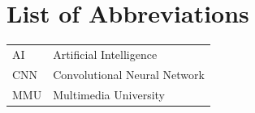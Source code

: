 \chapter*{List of Abbreviations}

\begin{tabular}{@{}p{3cm}l@{}}
    AI  & Artificial Intelligence \\
    CNN & Convolutional Neural Network \\
    MMU & Multimedia University \\
\end{tabular}
